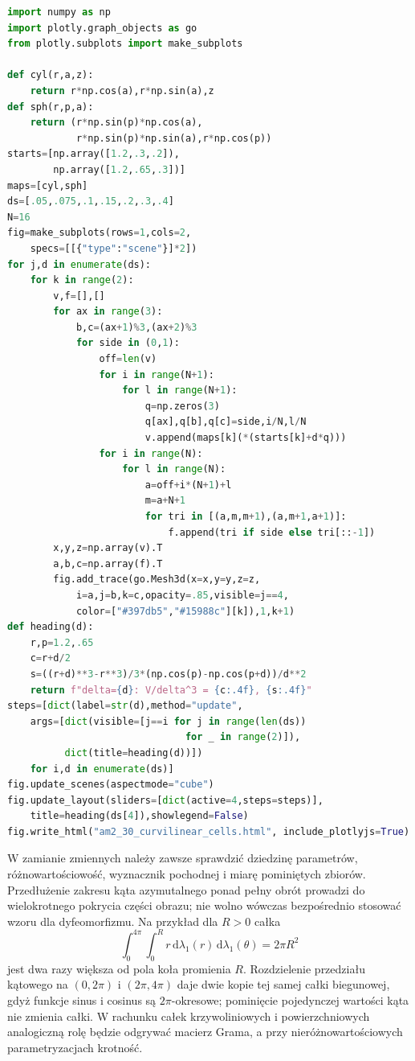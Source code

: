 \begin{lstlisting}[language=Python]
import numpy as np
import plotly.graph_objects as go
from plotly.subplots import make_subplots

def cyl(r,a,z):
    return r*np.cos(a),r*np.sin(a),z
def sph(r,p,a):
    return (r*np.sin(p)*np.cos(a),
            r*np.sin(p)*np.sin(a),r*np.cos(p))
starts=[np.array([1.2,.3,.2]),
        np.array([1.2,.65,.3])]
maps=[cyl,sph]
ds=[.05,.075,.1,.15,.2,.3,.4]
N=16
fig=make_subplots(rows=1,cols=2,
    specs=[[{"type":"scene"}]*2])
for j,d in enumerate(ds):
    for k in range(2):
        v,f=[],[]
        for ax in range(3):
            b,c=(ax+1)%3,(ax+2)%3
            for side in (0,1):
                off=len(v)
                for i in range(N+1):
                    for l in range(N+1):
                        q=np.zeros(3)
                        q[ax],q[b],q[c]=side,i/N,l/N
                        v.append(maps[k](*(starts[k]+d*q)))
                for i in range(N):
                    for l in range(N):
                        a=off+i*(N+1)+l
                        m=a+N+1
                        for tri in [(a,m,m+1),(a,m+1,a+1)]:
                            f.append(tri if side else tri[::-1])
        x,y,z=np.array(v).T
        a,b,c=np.array(f).T
        fig.add_trace(go.Mesh3d(x=x,y=y,z=z,
            i=a,j=b,k=c,opacity=.85,visible=j==4,
            color=["#397db5","#15988c"][k]),1,k+1)
def heading(d):
    r,p=1.2,.65
    c=r+d/2
    s=((r+d)**3-r**3)/3*(np.cos(p)-np.cos(p+d))/d**2
    return f"delta={d}: V/delta^3 = {c:.4f}, {s:.4f}"
steps=[dict(label=str(d),method="update",
    args=[dict(visible=[j==i for j in range(len(ds))
                               for _ in range(2)]),
          dict(title=heading(d))])
    for i,d in enumerate(ds)]
fig.update_scenes(aspectmode="cube")
fig.update_layout(sliders=[dict(active=4,steps=steps)],
    title=heading(ds[4]),showlegend=False)
fig.write_html("am2_30_curvilinear_cells.html", include_plotlyjs=True)
\end{lstlisting}

W zamianie zmiennych należy zawsze sprawdzić
dziedzinę parametrów, różnowartościowość,
wyznacznik pochodnej i miarę pominiętych zbiorów.
Przedłużenie zakresu kąta azymutalnego ponad
pełny obrót prowadzi do wielokrotnego pokrycia
części obrazu; nie wolno wówczas bezpośrednio
stosować wzoru dla dyfeomorfizmu.
Na przykład dla $R>0$ całka
\[
 \int_0^{4\pi}\int_0^R r\,
 \mathrm d\lambda_1(r)\,\mathrm d\lambda_1(\theta)
 =2\pi R^2
\]
jest dwa razy większa od pola koła promienia $R$.
Rozdzielenie przedziału kątowego na $(0,2\pi)$
i $(2\pi,4\pi)$ daje dwie kopie tej samej
całki biegunowej, gdyż funkcje sinus i cosinus
są $2\pi$-okresowe; pominięcie pojedynczej
wartości kąta nie zmienia całki. W rachunku całek
krzywoliniowych i powierzchniowych analogiczną
rolę będzie odgrywać macierz Grama, a przy
nieróżnowartościowych parametryzacjach krotność.
